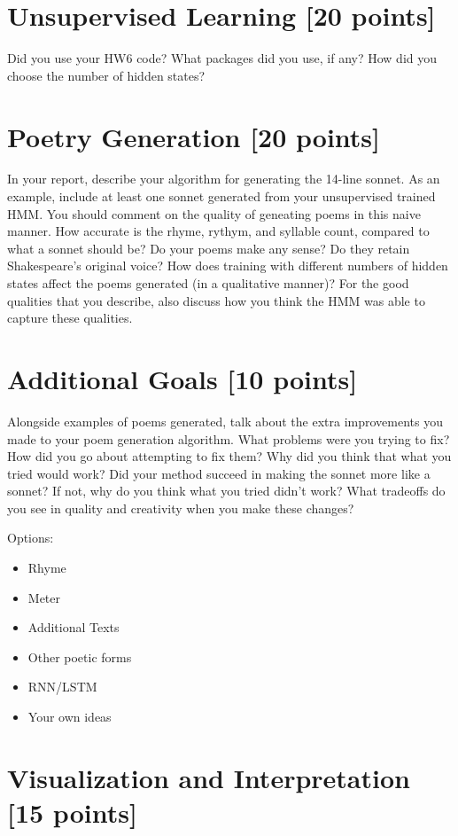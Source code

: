 \section{Unsupervised Learning [20 points]}

Did you use your HW6 code? What packages did you use, if any? How did you choose the number of hidden states?

\section{Poetry Generation [20 points]}

In your report, describe your algorithm for generating the 14-line sonnet. As an example, include at least one sonnet generated from your unsupervised trained HMM. You should comment on the quality of geneating poems in this naive manner. How accurate is the rhyme, rythym, and syllable count, compared to what a sonnet should be? Do your poems make any sense? Do they retain Shakespeare's original voice? How does training with different numbers of hidden states affect the poems generated (in a qualitative manner)? For the good qualities that you describe, also discuss how you think the HMM was able to capture these qualities.

\section{Additional Goals [10 points]}

Alongside examples of poems generated, talk about the extra improvements you made to your poem generation algorithm. What problems were you trying to fix? How did you go about attempting to fix them? Why did you think that what you tried would work? Did your method succeed in making the sonnet more like a sonnet? If not, why do you think what you tried didn't work? What tradeoffs do you see in quality and creativity when you make these changes?

Options:
\begin{itemize}
    \item Rhyme
    \item Meter
    \item Additional Texts
    \item Other poetic forms
    \item RNN/LSTM
    \item Your own ideas
\end{itemize}

\section{Visualization and Interpretation [15 points]}

